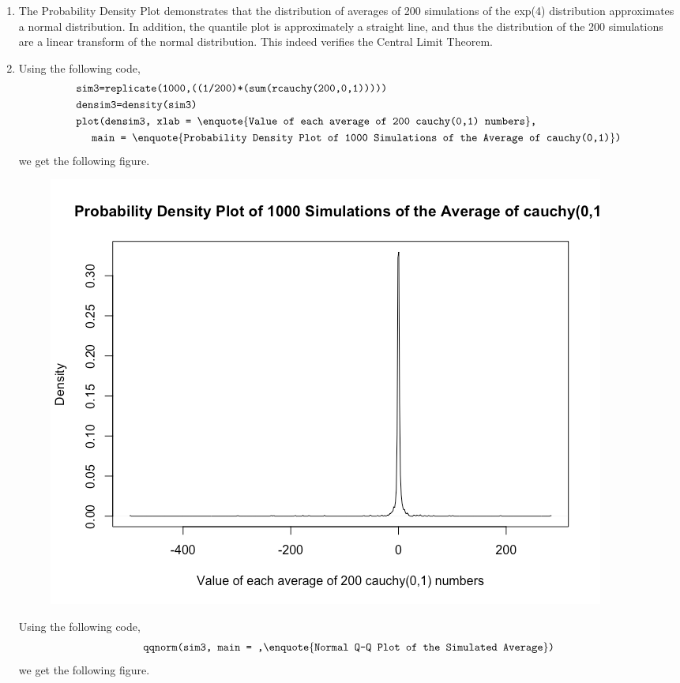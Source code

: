 \documentclass[a4paper]{article}
\newcommand{\code}{\texttt}
\begin{document}
\begin{enumerate}
\begin{enumerate}
		\item The Probability Density Plot demonstrates that the distribution of averages of 200 simulations of the exp(4) distribution approximates a normal distribution. In addition, the quantile plot is approximately a straight line, and thus the distribution of the 200 simulations are a linear transform of the normal distribution. This indeed verifies the Central Limit Theorem.

		\pagebreak

		\item Using the following code,
		\begin{align*}
			&\code{sim3=replicate(1000,((1/200)*(sum(rcauchy(200,0,1)))))}\\
			&\code{densim3=density(sim3)}\\
			&\code{plot(densim3, xlab = }\text{\enquote{\code{Value of each average of 200 cauchy(0,1) numbers}}}\code{,} \\
			& \hspace{5mm}\code{main = }\text{\enquote{\code{Probability Density Plot of 1000 Simulations of the Average of cauchy(0,1)}}}\code{)}\\
		\end{align*}
		we get the following figure.
		\begin{figure}[h!]
			\begin{center}
				\includegraphics[width=0.58\linewidth]{d1.png}
			\end{center}
		\end{figure}
		\bigbreak
		Using the following code,
		\begin{align*}
			&\code{qqnorm(sim3, main = ,}\text{\enquote{\code{Normal Q-Q Plot of the Simulated Average}}}\code{)}\\
		\end{align*}
		we get the following figure.
		\begin{figure}[h!]
			\begin{center}

\end{center}
\end{figure}
\end{enumerate}
\end{enumerate}
\end{document}
